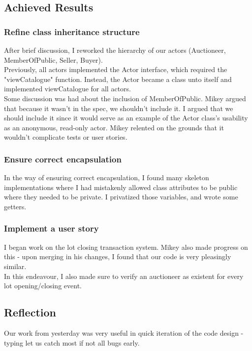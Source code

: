 \documentclass[titlepage, 12pt]{extarticle}
\begin{document}
\subsection{Achieved Results}
\subsubsection{Refine class inheritance structure}
After brief discussion, I reworked the hierarchy of our actors (Auctioneer,
MemberOfPublic, Seller, Buyer).\\

Previously, all actors implemented the Actor interface, which required the
"viewCatalogue" function. Instead, the Actor became a class unto itself and
implemented viewCatalogue for all actors.\\

Some discussion was had about the inclusion of MemberOfPublic. Mikey argued
that because it wasn't in the spec, we shouldn't include it. I argued that we
should include it since it would serve as an example of the Actor class's
usability as an anonymous, read-only actor. Mikey relented on the grounds that
it wouldn't complicate tests or user stories.\\

\subsubsection{Ensure correct encapsulation}
In the way of ensuring correct encapsulation, I found many skeleton
implementations where I had mistakenly allowed class attributes to be public
where they needed to be private. I privatized those variables, and wrote some
getters.

\subsubsection{Implement a user story}
I began work on the lot closing transaction system. Mikey also made progress on
this - upon merging in his changes, I found that our code is very pleasingly
similar.\\

In this endeavour, I also made sure to verify an auctioneer as existent for
every lot opening/closing event.

\subsection{Reflection}
Our work from yesterday was very useful in quick iteration of the code design -
typing let us catch most if not all bugs early.\\
\end{document}
